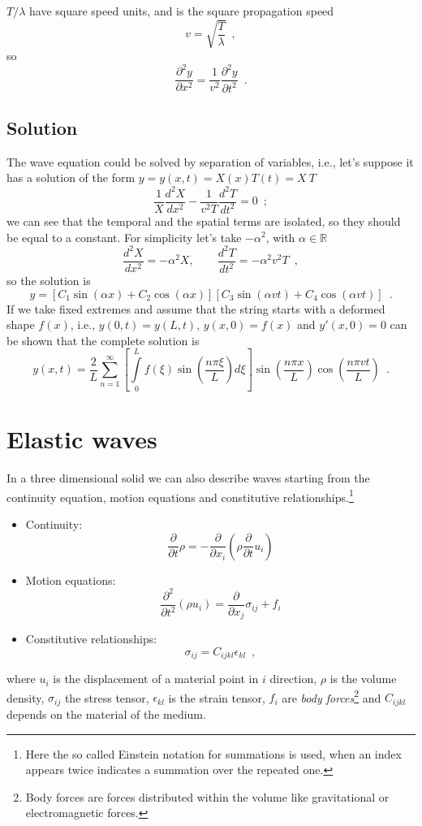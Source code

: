 \documentclass[12pt,letterpaper]{article}
\begin{document}
$T/\lambda$ have square speed units, and is the square propagation speed
\[v = \sqrt{\frac{T}{\lambda}} \enspace ,\]
so
\[\frac{\partial^2 y}{\partial x^2} = \frac{1}{v^2} \frac{\partial^2 y}{\partial t^2} \enspace .\]

\subsection{Solution}
The wave equation could be solved by separation of variables, i.e., let's suppose it has a solution of the form $y=y(x,t)=X(x)T(t)=X\ T$
\[\frac{1}{X} \frac{d^2 X}{dx^2} - \frac{1}{v^2 T} \frac{d^2 T}{dt^2} = 0 \enspace ;\]
we can see that the temporal and the spatial terms are isolated, so they should be equal to a constant. For simplicity let's take $-\alpha^2$, with $\alpha\in \mathbb{R}$
\[\frac{d^2 X}{dx^2}=-\alpha^2 X, \qquad \frac{d^2 T}{dt^2}=-\alpha^2 v^2 T \enspace ,\]
so the solution is
\[y = \left[C_1 \sin(\alpha x)+ C_2\cos(\alpha x) \right] \left[C_3\sin(\alpha v t) +C_4 \cos(\alpha v t)\right] \enspace .\]
If we take fixed extremes and assume that the string starts with a deformed shape $f(x)$, i.e., $y(0,t)=y(L,t)$, $y(x,0)=f(x)$ and $y'(x,0)=0$ can be shown that the complete solution is
\[y(x,t) = \frac{2}{L}\sum\limits_{n=1}^{\infty}\left[\int\limits_{0}^{L}f(\xi)\sin\left(\frac{n\pi\xi}{L}\right)d\xi\right] \sin\left(\frac{n\pi x}{L}\right)\cos\left(\frac{n\pi v t}{L}\right) \enspace .\] 

\section{Elastic waves}
In a three dimensional solid we can also describe waves starting from the continuity equation, motion equations and constitutive relationships.\footnote{Here the so called Einstein notation for summations is used, when an index appears twice indicates a summation over the repeated one.}
\begin{itemize}
\item Continuity:
\[\frac{\partial}{\partial t}\rho = - \frac{\partial}{\partial x_i}\left( \rho \frac{\partial}{\partial t} u_i\right)\]

\item Motion equations:
\[ \frac{\partial^2}{\partial t^2}(\rho u_i) = \frac{\partial}{\partial x_j} \sigma_{ij} + f_i \]

\item Constitutive relationships:
\[\sigma_{ij} = C_{ijkl} \epsilon_{kl}  \enspace ,\]

\end{itemize}
where $u_i$ is the displacement of a material point in $i$ direction, $\rho$ is the volume density, $\sigma_{ij}$ the stress tensor, $\epsilon_{kl}$ is the strain tensor, $f_i$ are \emph{body forces}\footnote{Body forces are forces distributed within the volume like gravitational or electromagnetic forces.} and $C_{ijkl}$ depends on the material of the medium.
\end{document}
